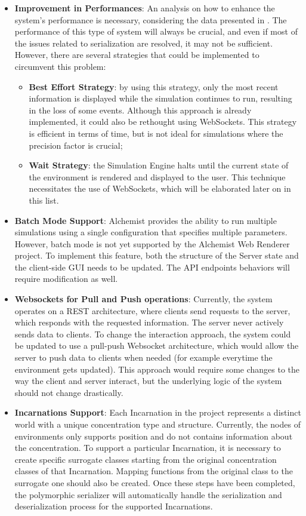 \begin{itemize}
	\item \textbf{Improvement in Performances}: An analysis on how to enhance the system's performance is necessary, considering the data presented in . The performance of this type of system will always be crucial, and even if most of the issues related to serialization are resolved, it may not be sufficient. However, there are several strategies that could be implemented to circumvent this problem:
	\begin{itemize}
		\item \textbf{Best Effort Strategy}: by using this strategy, only the most recent information is displayed while the simulation continues to run, resulting in the loss of some events. Although this approach is already implemented, it could also be rethought using WebSockets. This strategy is efficient in terms of time, but is not ideal for simulations where the precision factor is crucial;
		\item \textbf{Wait Strategy}: the Simulation Engine halts until the current state of the environment is rendered and displayed to the user. This technique necessitates the use of WebSockets, which will be elaborated later on in this list.
	\end{itemize}
	\item \textbf{Batch Mode Support}: Alchemist provides the ability to run multiple simulations using a single configuration that specifies multiple parameters. However, batch mode is not yet supported by the Alchemist Web Renderer project. To implement this feature, both the structure of the Server state and the client-side GUI needs to be updated. The API endpoints behaviors will require modification as well.
	\item \textbf{Websockets for Pull and Push operations}: Currently, the system operates on a REST architecture, where clients send requests to the server, which responds with the requested information. The server never actively sends data to clients. To change the interaction approach, the system could be updated to use a pull-push Websocket architecture, which would allow the server to push data to clients when needed (for example everytime the environment gets updated). This approach would require some changes to the way the client and server interact, but the underlying logic of the system should not change drastically.
	\item \textbf{Incarnations Support}: Each Incarnation in the project represents a distinct world with a unique concentration type and structure. Currently, the nodes of environments only supports position and do not contains information about the concentration. To support a particular Incarnation, it is necessary to create specific surrogate classes starting from the original concentration classes of that Incarnation. Mapping functions from the original class to the surrogate one should also be created. Once these steps have been completed, the polymorphic serializer will automatically handle the serialization and deserialization process for the supported Incarnations.

\end{itemize}
